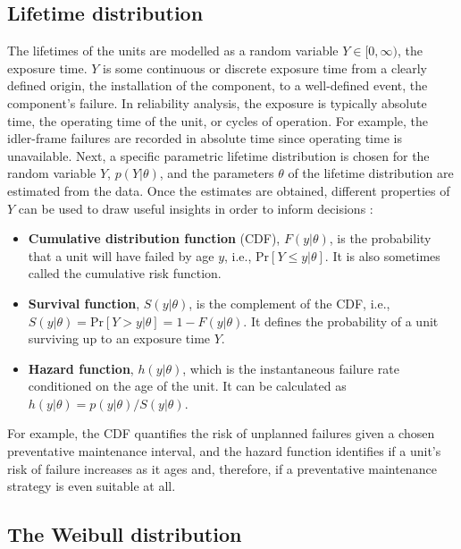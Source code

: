 \subsection{Lifetime distribution}

The lifetimes of the units are modelled as a random variable $Y \in [0, \infty)$, the exposure time. $Y$ is some continuous or discrete exposure time from a clearly defined origin, the installation of the component, to a well-defined event, the component's failure. In reliability analysis, the exposure is typically absolute time, the operating time of the unit, or cycles of operation. For example, the idler-frame failures are recorded in absolute time since operating time is unavailable. Next, a specific parametric lifetime distribution is chosen for the random variable $Y$, $p(Y|\theta)$, and the parameters $\theta$ of the lifetime distribution are estimated from the data. Once the estimates are obtained, different properties of $Y$ can be used to draw useful insights in order to inform decisions \citep{hamada_2008}:
\begin{itemize}
    \item \textbf{Cumulative distribution function} (CDF), $F(y|\theta)$, is the probability that a unit will have failed by age $y$, i.e., $\text{Pr}\left[Y \le y|\theta\right]$. It is also sometimes called the cumulative risk function.
    \item \textbf{Survival function}, $S(y|\theta)$, is the complement of the CDF, i.e., $S(y|\theta) = \text{Pr}\left[Y > y|\theta\right] = 1 - F(y|\theta)$. It defines the probability of a unit surviving up to an exposure time $Y$.
    \item \textbf{Hazard function}, $h(y|\theta)$, which is the instantaneous failure rate conditioned on the age of the unit. It can be calculated as $h(y|\theta) = p(y|\theta) / S(y|\theta)$.
\end{itemize}
For example, the CDF quantifies the risk of unplanned failures given a chosen preventative maintenance interval, and the hazard function identifies if a unit's risk of failure increases as it ages and, therefore, if a preventative maintenance strategy is even suitable at all.

\subsection{The Weibull distribution} \label{subsec:weibull-dist}

